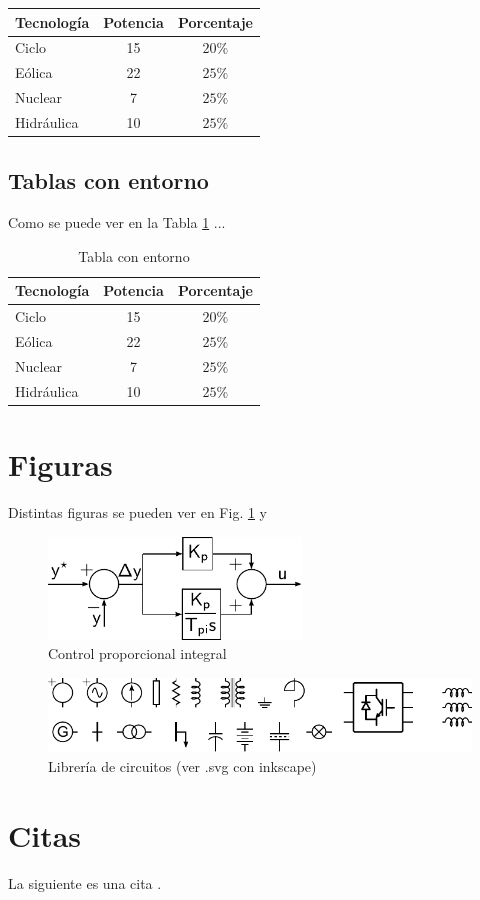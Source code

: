 \begin{tabular}{lcc}
\toprule
Tecnología & Potencia & Porcentaje \\ 
\midrule
Ciclo  & 15 & $20\%$ \\ 
Eólica & 22 & $25\%$ \\ 
Nuclear & 7 & $25\%$ \\ 
Hidráulica & 10 & $25\%$ \\ 
\bottomrule
\end{tabular} 

\subsection{Tablas con entorno}


Como se puede ver en la Tabla \ref{tbl:nombre_tabla} ...

 
 
\begin{table}
\centering
\begin{tabular}{lcc}
\toprule
Tecnología & Potencia & Porcentaje \\ 
\midrule
Ciclo  & 15 & $20\%$ \\ 
Eólica & 22 & $25\%$ \\ 
Nuclear & 7 & $25\%$ \\ 
Hidráulica & 10 & $25\%$ \\ 
\bottomrule
\end{tabular} 

\caption{Tabla con entorno}
\label{tbl:nombre_tabla}
\end{table}

\section{Figuras}
 
Distintas figuras se pueden ver en Fig. \ref{fig:ctrl_pi} y 
\begin{figure}
	\includegraphics[width=0.6\textwidth]{model/pdf/pi.pdf} 
	\caption{Control proporcional integral}
	\label{fig:ctrl_pi}
\end{figure}
 
 
\begin{figure}
	\includegraphics[width=\textwidth]{./pdf/circuitos.pdf} 
	\caption{Librería de circuitos (ver .svg con inkscape)}
	\label{fig:circuitos}
\end{figure}


\section{Citas}

La siguiente es una cita \cite{Rodriguez2007}.
 
 
 
 


